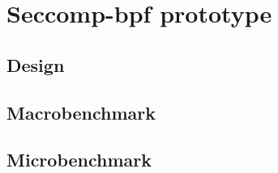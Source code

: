 \chapter{Seccomp-bpf prototype}

\section{Design}
\section{Macrobenchmark}
\section{Microbenchmark}




